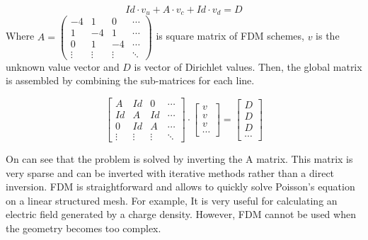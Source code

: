 \begin{refsection}
  \begin{equation}
    Id \cdot v_{u} + A \cdot v_{c} + Id \cdot v_{d} = D   
  \end{equation}
  Where $ A =
    \begin{pmatrix}
    -4     & 1      & 0      & \cdots \\
    1      & -4     & 1      & \cdots \\
    0      & 1      & -4     & \cdots \\
    \vdots & \vdots & \vdots & \ddots
    \end{pmatrix} $ is square matrix of FDM schemes, $v$ is the unknown value vector and $D$ is vector of Dirichlet values. Then, the global matrix is assembled by combining the sub-matrices for each line.

  \begin{equation}
    \begin{bmatrix}
      A      & Id     & 0      & \cdots \\
      Id     & A      & Id     & \cdots \\
      0      & Id     & A      & \cdots \\
      \vdots & \vdots & \vdots & \ddots
    \end{bmatrix}
    \cdot
    \begin{bmatrix}
      v \\
      v \\
      v \\
      \cdots
    \end{bmatrix}
    =
    \begin{bmatrix}
      D \\
      D \\
      D \\
      \cdots
    \end{bmatrix}
  \end{equation}

  On can see that the problem is solved by inverting the A matrix. This matrix is very sparse and can be inverted with iterative methods rather than a direct inversion. FDM is straightforward and allows to quickly solve Poisson’s equation on a linear structured mesh. For example, It is very useful for calculating an electric field generated by a charge density. However, FDM cannot be used when the geometry becomes too complex.


\end{refsection}
